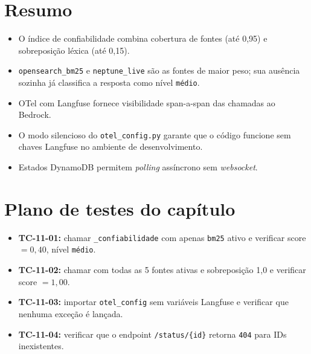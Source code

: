 \section{Resumo}

\begin{itemize}[leftmargin=*]
  \item O \'indice de confiabilidade combina cobertura de fontes
        (at\'e 0{,}95) e sobreposi\c{c}\~ao l\'exica (at\'e 0{,}15).
  \item \texttt{opensearch\_bm25} e \texttt{neptune\_live} s\~ao as
        fontes de maior peso; sua aus\^encia sozinha j\'a classifica
        a resposta como n\'ivel \texttt{m\'edio}.
  \item OTel com Langfuse fornece visibilidade span-a-span das
        chamadas ao Bedrock.
  \item O modo silencioso do \texttt{otel\_config.py} garante que
        o c\'odigo funcione sem chaves Langfuse no ambiente de
        desenvolvimento.
  \item Estados DynamoDB permitem \textit{polling} ass\'incrono
        sem \textit{websocket}.
\end{itemize}

\section{Plano de testes do cap\'itulo}

\begin{itemize}[leftmargin=*]
  \item \textbf{TC-11-01:} chamar \texttt{\_confiabilidade} com apenas
        \texttt{bm25} ativo e verificar score $= 0{,}40$, n\'ivel
        \texttt{m\'edio}.
  \item \textbf{TC-11-02:} chamar com todas as 5 fontes ativas e
        sobreposi\c{c}\~ao 1{,}0 e verificar score $= 1{,}00$.
  \item \textbf{TC-11-03:} importar \texttt{otel\_config} sem
        vari\'aveis Langfuse e verificar que nenhuma exce\c{c}\~ao
        \'e lan\c{c}ada.
  \item \textbf{TC-11-04:} verificar que o endpoint
        \texttt{/status/\{id\}} retorna \texttt{404} para IDs
        inexistentes.
\end{itemize}

